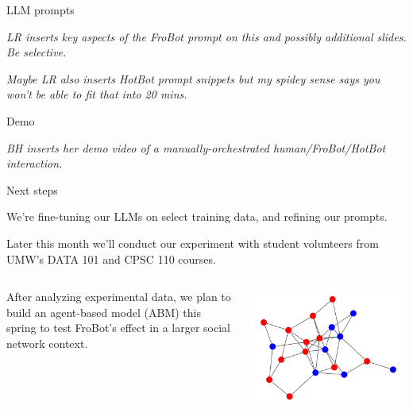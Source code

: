 \documentclass[12pt]{beamer}
\begin{document}
\begin{frame}[c]{LLM prompts}

\textit{LR inserts key aspects of the FroBot prompt on this and possibly additional slides. Be selective.}

\textit{Maybe LR also inserts HotBot prompt snippets but my spidey sense says you won't be able to fit that into 20 mins.}

\end{frame}
\begin{frame}[c]{Demo}

\textit{BH inserts her demo video of a manually-orchestrated human/FroBot/HotBot interaction.}

\end{frame}
\begin{frame}[c]{Next steps}

We're fine-tuning our LLMs on select training data, and refining our prompts.

\pause
Later this month we'll conduct our experiment with student volunteers from UMW's DATA 101 and CPSC 110 courses.
\pause


\begin{columns}[c,onlytextwidth]
  \begin{column}{0.6\textwidth}
After analyzing experimental data, we plan to build an agent-based model (ABM) this spring to test FroBot's effect in a larger social network context.
  \end{column}
  \begin{column}{0.4\textwidth}
    \includegraphics[width=\linewidth]{agraph.png}
  \end{column}
\end{columns}

\end{frame}
\end{document}
